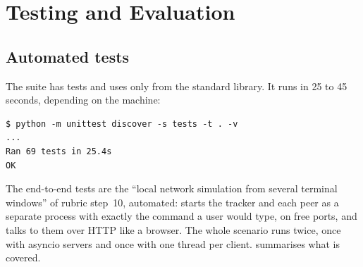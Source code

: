 \section{Testing and Evaluation}\label{sec:testing}

\subsection{Automated tests}
The suite has \FactTests{} tests and uses only  from the standard library. It runs in
25 to 45 seconds, depending on the machine:

\begin{lstlisting}[style=text, caption={Running the tests}, label={lst:run-tests}]
$ python -m unittest discover -s tests -t . -v
...
Ran 69 tests in 25.4s
OK
\end{lstlisting}

The end-to-end tests are the ``local network simulation from several terminal windows'' of rubric
step~10, automated:  starts the tracker and each peer as a separate process
with exactly the command a user would type, on free ports, and talks to them over HTTP like a
browser. The whole scenario runs twice, once with asyncio servers and once with one thread per
client.  summarises what is covered.

